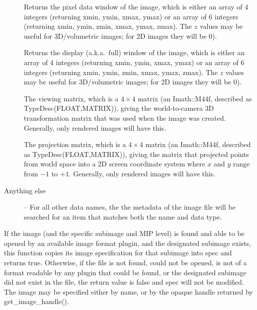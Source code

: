 \begin{description}
\item[\rm {}] 
Returns the pixel data window of the image, which is either an array of 4
integers (returning xmin, ymin, xmax, ymax) or an array of 6 integers
(returning xmin, ymin, zmin, xmax, ymax, zmax). The $z$ values may be useful
for 3D/volumetric images; for 2D images they will be 0).

\item[\rm {}] 
Returns the display (a.k.a.\ full) window of the image, which is either an
array of 4 integers (returning xmin, ymin, xmax, ymax) or an array of 6
integers (returning xmin, ymin, zmin, xmax, ymax, zmax). The $z$ values may
be useful for 3D/volumetric images; for 2D images they will be 0).

\item[\rm {}] The viewing matrix, which is a $4 \times 4$
matrix (an {\cf Imath::M44f}, described as {\cf TypeDesc(FLOAT,MATRIX)}),
giving the world-to-camera 3D transformation matrix that was used when  the
image was created. Generally, only rendered images will have this.

\item[\rm {}] The projection matrix, which is a $4 \times 4$
matrix (an {\cf Imath::M44f}, described as {\cf TypeDesc(FLOAT,MATRIX)}),
giving the matrix that projected points from world space into a 2D screen
coordinate system where $x$ and $y$ range from $-1$ to $+1$.  Generally,
only rendered images will have this.

\item[Anything else] -- For all other data names, the
the metadata of the image file will be searched for an item that
matches both the name and data type.

\end{description}
\apiend


If the image (and the specific subimage and MIP level) is found and able to
be opened by an available
image format plugin, and the designated subimage exists, this function copies
its image specification for that subimage into {\cf spec} and returns
{\cf true}.  Otherwise, if the file is not found, could not be opened,
is not of a format readable by any plugin that could be found, or
the designated subimage did not exist in the file, the return value is
{\cf false} and {\cf spec} will not be modified.
The image may be specified either by name, or by the opaque handle returned
by {\cf get_image_handle()}.

